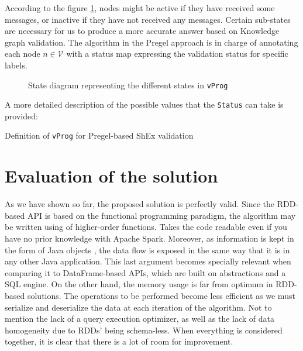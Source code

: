 According to the figure \ref{fig:state:pregel}, nodes might be active if they have received some messages, or inactive if they have not received any messages. Certain sub-states are necessary for us to produce a more accurate answer based on Knowledge graph validation. The algorithm in the Pregel approach is in charge of annotating each node $n\in\mathcal{V}$ with a status map expressing the validation status for specific labels.

\begin{figure}[H]
    \centering
    
    \caption[State diagram representing the different states in \texttt{vProg}]{State diagram representing the different states in \texttt{vProg}~\cite{https://doi.org/10.48550/arxiv.2110.11709}}
    \label{fig:state:pregel}
\end{figure}

A more detailed description of the possible values that the \texttt{Status} can take is provided:

\begin{center}
    
\end{center}

\begin{pseudocode}
    
\end{pseudocode}

\begin{table}
    \centering
    
    \caption{Definition of \texttt{vProg} for Pregel-based ShEx validation}
\end{table}
\label{vProg}
\section{Evaluation of the solution}

As we have shown so far, the proposed solution is perfectly valid. Since the RDD-based API is based on the functional programming paradigm, the algorithm may be written using of higher-order functions. Takes the code readable even if you have no prior knowledge with Apache Spark. Moreover, as information is kept in the form of Java objects , the data flow is exposed in the same way that it is in any other Java application. This last argument becomes specially relevant when comparing it to DataFrame-based APIs, which are built on abstractions and a SQL engine. On the other hand, the memory usage is far from optimum in RDD-based solutions. The operations to be performed become less efficient as we must serialize and deserialize the data at each iteration of the algorithm. Not to mention the lack of a query execution optimizer, as well as the lack of data homogeneity due to RDDs' being schema-less. When everything is considered together, it is clear that there is a lot of room for improvement.